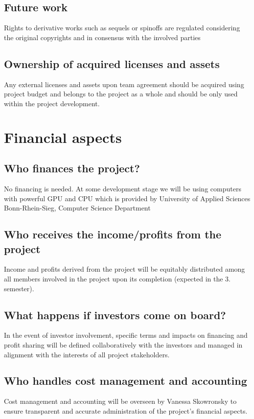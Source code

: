 \documentclass{article}
\begin{document}
\subsection{Future work}
Rights to derivative works such as sequels or spinoffs are regulated considering the original copyrights and in consensus with the involved parties
\subsection{Ownership of acquired licenses and assets}
Any external licenses and assets upon team agreement should be acquired using project budget and belongs to the project as a whole and should be only used within the project development.

\section{Financial aspects}
\subsection{Who finances the project?}
No financing is needed.
At some development stage we will be using computers with powerful GPU and CPU which is provided by University of Applied Sciences Bonn-Rhein-Sieg, Computer Science Department
\subsection{Who receives the income/profits from the project}
Income and profits derived from the project will be equitably distributed among all members involved in the project upon its completion (expected in the 3. semester).
\subsection{What happens if investors come on board?}
In the event of investor involvement, specific terms and impacts on financing and profit sharing will be defined collaboratively with the investors and managed in alignment with the interests of all project stakeholders.
\subsection{Who handles cost management and accounting}
Cost management and accounting will be overseen by Vanessa Skowronsky to ensure transparent and accurate administration of the project's financial aspects.
\end{document}
